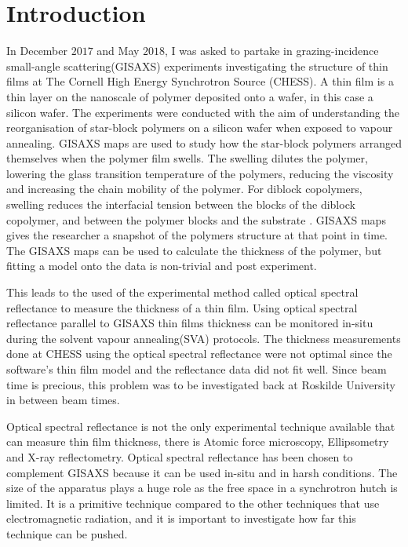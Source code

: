 \documentclass[MasterThesisMain.tex]{subfiles}
\begin{document}
	\chapter{Introduction}
	
In December $2017$ and May $2018$, I was asked to partake in grazing-incidence small-angle scattering(GISAXS) experiments investigating the structure of thin films at The Cornell High Energy Synchrotron Source (CHESS). A thin film is a thin layer on the nanoscale of polymer deposited onto a wafer, in this case a silicon wafer. The experiments were conducted with the aim of understanding the reorganisation of star-block polymers on a silicon wafer when exposed to vapour annealing. GISAXS maps are used to study how the star-block polymers arranged themselves when the polymer film swells. The swelling dilutes the polymer, lowering the glass transition temperature of the polymers, reducing the viscosity and increasing the chain mobility of the polymer. For diblock copolymers, swelling reduces the interfacial tension between the blocks of the diblock copolymer, and between the polymer blocks and the substrate \cite{posseltintro}. GISAXS maps gives the researcher a snapshot of the polymers structure at that point in time. The GISAXS maps can be used to calculate the thickness of the polymer, but fitting a model onto the data is non-trivial and post experiment.

This leads to the used of the experimental method called optical spectral reflectance to measure the thickness of a thin film. Using optical spectral reflectance parallel to GISAXS thin films thickness can be monitored in-situ during the solvent vapour annealing(SVA) protocols. The thickness measurements done at CHESS using the optical spectral reflectance were not optimal since the software's thin film model and the reflectance data did not fit well. Since beam time is precious, this problem was to be investigated back at Roskilde University in between beam times.

Optical spectral reflectance is not the only experimental technique available that can measure thin film thickness, there is Atomic force microscopy, Ellipsometry and X-ray reflectometry. Optical spectral reflectance has been chosen to complement GISAXS because it can be used in-situ and in harsh conditions. The size of the apparatus plays a huge role as the free space in a synchrotron hutch is limited. It is a primitive technique compared to the other techniques that use electromagnetic radiation, and it is important to investigate how far this technique can be pushed.
\end{document}
